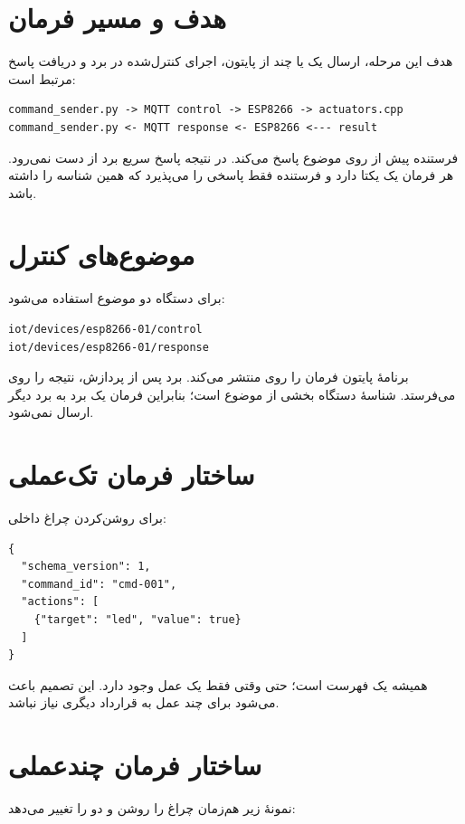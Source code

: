 \section{هدف و مسیر فرمان}
هدف این مرحله، ارسال یک یا چند
از پایتون، اجرای کنترل‌شده در برد و دریافت پاسخ مرتبط است:

\begin{LTR}
\begin{lstlisting}
command_sender.py -> MQTT control -> ESP8266 -> actuators.cpp
command_sender.py <- MQTT response <- ESP8266 <--- result
\end{lstlisting}
\end{LTR}

فرستنده پیش از
روی موضوع پاسخ
می‌کند. در نتیجه پاسخ سریع برد از دست نمی‌رود. هر فرمان یک
یکتا دارد و فرستنده فقط پاسخی را می‌پذیرد که همین شناسه را داشته باشد.

\section{موضوع‌های کنترل}
برای دستگاه
دو موضوع استفاده می‌شود:

\begin{LTR}
\begin{lstlisting}
iot/devices/esp8266-01/control
iot/devices/esp8266-01/response
\end{lstlisting}
\end{LTR}

برنامهٔ پایتون فرمان را روی
منتشر می‌کند. برد پس از پردازش، نتیجه را روی
می‌فرستد. شناسهٔ دستگاه بخشی از موضوع است؛ بنابراین فرمان یک برد به برد دیگر ارسال نمی‌شود.

\section{ساختار فرمان تک‌عملی}
برای روشن‌کردن چراغ داخلی:

\begin{LTR}
\begin{lstlisting}
{
  "schema_version": 1,
  "command_id": "cmd-001",
  "actions": [
    {"target": "led", "value": true}
  ]
}
\end{lstlisting}
\end{LTR}

همیشه یک فهرست است؛ حتی وقتی فقط یک عمل وجود دارد. این تصمیم باعث می‌شود برای چند عمل به قرارداد دیگری نیاز نباشد.

\section{ساختار فرمان چندعملی}
نمونهٔ زیر هم‌زمان چراغ را روشن و دو
را تغییر می‌دهد:

